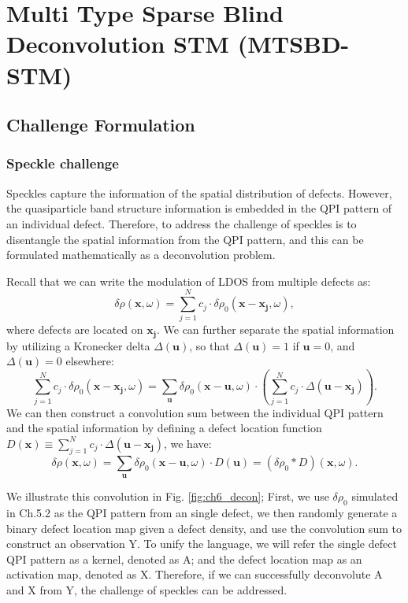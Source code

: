 \chapter{Multi Type Sparse Blind Deconvolution STM (MTSBD-STM)}
\section{Challenge Formulation}
\subsection{Speckle challenge}
Speckles capture the information of the spatial distribution of defects. However, the quasiparticle band structure information is embedded in the \ac{QPI} pattern of an individual defect. Therefore, to address the challenge of speckles is to disentangle the spatial information from the \ac{QPI} pattern, and this can be formulated mathematically as a deconvolution problem. 
\par \noindent Recall that we can write the modulation of \ac{LDOS} from multiple defects as:
\begin{equation}
	\delta \rho(\mathbf{x}, \omega) = \sum_{j=1}^{N}c_j \cdot \delta \rho_0(\mathbf{x}-\mathbf{x_j},\omega),
\end{equation}
\noindent where defects are located on $\mathbf{x_j}$. We can further separate the spatial information by utilizing a Kronecker delta $\Delta(\mathbf{u})$, so that $\Delta(\mathbf{u})=1$ if $\mathbf{u} = 0$, and $\Delta(\mathbf{u})=0$ elsewhere: 
\begin{equation}
	\sum_{j=1}^{N}c_j \cdot \delta \rho_0(\mathbf{x}-\mathbf{x_j},\omega) = \sum_{\mathbf{u}} \delta \rho_0(\mathbf{x}-\mathbf{u},\omega)\cdot(\sum_{j=1}^{N} c_j \cdot \Delta(\mathbf{u-x_j})).
\end{equation}
\noindent We can then construct a convolution sum between the individual \ac{QPI} pattern and the spatial information by defining a defect location function $D(\mathbf{x}) \equiv \sum_{j=1}^{N} c_j \cdot \Delta(\mathbf{u-x_j})$, we have: 
\begin{equation}
 	\delta \rho(\mathbf{x}, \omega) =  \sum_{\mathbf{u}} \delta \rho_0(\mathbf{x}-\mathbf{u},\omega)\cdot D(\mathbf{u}) = (\delta \rho_0 *D)(\mathbf{x}, \omega).
\end{equation}

We illustrate this convolution in Fig. \ref{fig:ch6_decon}; First, we use $\delta \rho_0$ simulated in Ch.5.2 as the \ac{QPI} pattern from an single defect, we then randomly generate a binary defect location map given a defect density, and use the convolution sum to construct an observation Y. To unify the language, we will refer the single defect \ac{QPI} pattern as a kernel, denoted as A; and the defect location map as an activation map, denoted as X. Therefore, if we can successfully deconvolute A and X from Y, the challenge of speckles can be addressed.

